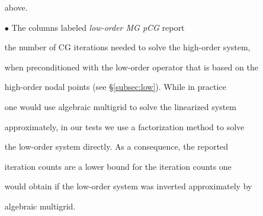 \documentclass[smallcondensed,final]{svjour3}     %
\begin{document}
\begin{itemize}
  above.

\item[$\bullet$] The columns labeled \emph{low-order MG pCG} report

  the number of CG iterations needed to solve the high-order system,

  when preconditioned with the low-order operator that is based on the

  high-order nodal points (see \S\ref{subsec:low}).  While in practice

  one would use algebraic multigrid to solve the linearized system

  approximately, in our tests we use a factorization method to solve

  the low-order system directly.  As a consequence, the reported

  iteration counts are a lower bound for the iteration counts one

  would obtain if the low-order system was inverted approximately by

  algebraic multigrid.






















\end{itemize}
\end{document}
